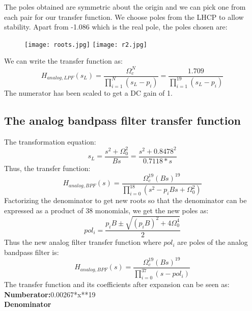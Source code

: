 \documentclass[12pt]{article}
\begin{document}
The poles obtained are symmetric about the origin and we can pick one from each pair for our transfer function. We choose poles from the LHCP to allow stability. 
\newpage
Apart from -1.086 which is the real pole, the poles chosen are:
\begin{figure}[H]
    \centering
    \texttt{[image: roots.jpg]}
    \texttt{[image: r2.jpg]}
\end{figure}
We can write the transfer function as:
\begin{equation}
    H_{analog,LPF}(s_L)=\frac{\Omega_{c}^N}{\prod_{i=1}^{N}(s_L-p_i)} = \frac{1.709}{\prod_{i=1}^{19}(s_L-p_i)}
\end{equation}
The numerator has been scaled to get a DC gain of 1.
\subsection{The analog bandpass filter transfer function}
The transformation equation:
\begin{equation}
    s_L= \frac{s^2+\Omega_{0}^2}{Bs} = \frac{s^2+0.8478^2}{0.7118*s}
\end{equation}
Thus, the transfer function:
\begin{equation}
    H_{analog,BPF}(s)=\frac{\Omega_{c}^{19}(Bs)^{19}}{\prod_{i=0}^{18}(s^2-p_iBs+\Omega_{0}^2)} 
\end{equation}
Factorizing the denominator to get new roots so that the denominator can be expressed as a product of 38 monomials, we get the new poles as:
\begin{equation}
    pol_i=\frac{p_iB\pm \sqrt{(p_iB)^2+4\Omega_{0}^4}}{2}
\end{equation}
Thus the new analog filter transfer function where $pol_i$ are poles of the analog bandpass filter is:
\begin{equation}
    H_{analog,BPF}(s)=\frac{\Omega_{c}^{19}(Bs)^{19}}{\prod_{i=0}^{37}(s-pol_i)} 
\end{equation}
\newpage
The transfer function and its coefficients after expansion can be seen as:
\\\textbf{Numberator:}0.00267*x**19
\\\textbf{Denominator}
\end{document}
